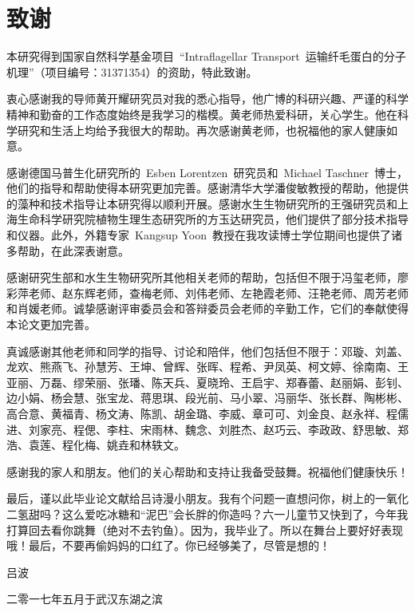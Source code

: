 \chapter{致\quad 谢}
\renewcommand{\leftmark}{致\quad 谢}
本研究得到国家自然科学基金项目\ “Intraflagellar Transport\ 运输纤毛蛋白的分子机理”（项目编号：31371354）的资助，特此致谢。

衷心感谢我的导师黄开耀研究员对我的悉心指导，他广博的科研兴趣、严谨的科学精神和勤奋的工作态度始终是我学习的楷模。黄老师热爱科研，关心学生。他在科学研究和生活上均给予我很大的帮助。再次感谢黄老师，也祝福他的家人健康如意。

感谢德国马普生化研究所的\ Esben Lorentzen\ 研究员和\ Michael Taschner\ 博士，他们的指导和帮助使得本研究更加完善。感谢清华大学潘俊敏教授的帮助，他提供的藻种和技术指导让本研究得以顺利开展。感谢水生生物研究所的王强研究员和上海生命科学研究院植物生理生态研究所的方玉达研究员，他们提供了部分技术指导和仪器。此外，外籍专家\ Kangsup Yoon\ 教授在我攻读博士学位期间也提供了诸多帮助，在此深表谢意。

感谢研究生部和水生生物研究所其他相关老师的帮助，包括但不限于冯玺老师，廖彩萍老师、赵东辉老师，查梅老师、刘伟老师、左艳霞老师、汪艳老师、周芳老师和肖媛老师。诚挚感谢评审委员会和答辩委员会老师的辛勤工作，它们的奉献使得本论文更加完善。

真诚感谢其他老师和同学的指导、讨论和陪伴，他们包括但不限于：邓璇、刘盖、龙欢、熊燕飞、孙慧芳、王坤、曾辉、张晖、程希、尹凤英、柯文婷、徐南南、王亚丽、万磊、缪荣丽、张璠、陈天兵、夏晓玲、王启宇、郑春蕾、赵丽娟、彭钊、边小娟、杨会慧、张宝龙、蒋思琪、段光前、马小翠、冯丽华、张长群、陶彬彬、高合意、黄福青、杨文涛、陈凯、胡金璐、李威、章可可、刘金良、赵永祥、程儒进、刘家亮、程偲、李柱、宋雨林、魏念、刘胜杰、赵巧云、李政政、舒思敏、郑浩、袁莲、程化梅、姚垚和林轶文。

感谢我的家人和朋友。他们的关心帮助和支持让我备受鼓舞。祝福他们健康快乐！

最后，谨以此毕业论文献给吕诗漫小朋友。我有个问题一直想问你，树上的一氧化二氢甜吗？这么爱吃冰糖和“泥巴”会长胖的你造吗？六一儿童节又快到了，今年我打算回去看你跳舞（绝对不去钓鱼）。因为，我毕业了。所以在舞台上要好好表现哦！最后，不要再偷妈妈的口红了。你已经够美了，尽管是想的！
\vspace{3em}

\hspace{25em}吕\quad 波
\vspace{1em}

\hfill 二零一七年五月于武汉东湖之滨

